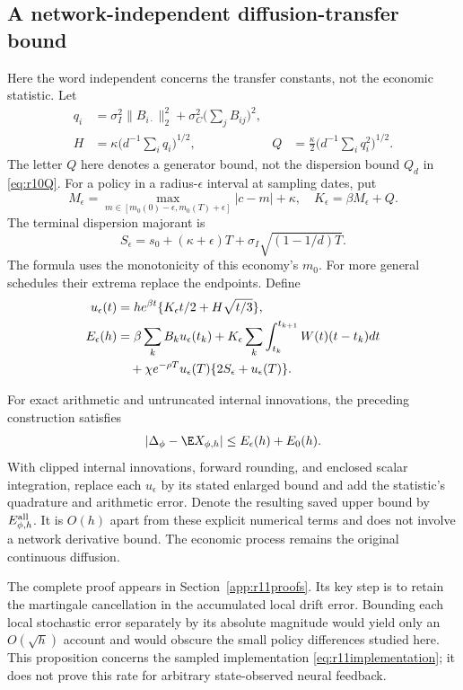 \subsection{A network-independent diffusion-transfer bound}
Here the word independent concerns the transfer constants, not the economic statistic. Let
\begin{align*}
 q_i&=\sigma_I^2\|B_{i\cdot}\|_2^2+
                  \sigma_C^2\Big(\sum_jB_{ij}\Big)^2,\\
 H&=\kappa\Big(d^{-1}\sum_i q_i\Big)^{1/2},&
 Q&=\frac\kappa2\Big(d^{-1}\sum_i q_i^2\Big)^{1/2}.
\end{align*}
The letter $Q$ here denotes a generator bound, not the dispersion bound $Q_d$ in \eqref{eq:r10Q}. For a policy in a radius-$\epsilon$ interval at sampling dates, put
\[
 M_\epsilon=\max_{m\in[m_0(0)-\epsilon,m_0(T)+\epsilon]}|c-m|+\kappa,
 \quad K_\epsilon=\beta M_\epsilon+Q.
\]
The terminal dispersion majorant is
\[
 S_\epsilon=s_0+(\kappa+\epsilon)T+
                         \sigma_I\sqrt{(1-1/d)T}.
\]
The formula uses the monotonicity of this economy's $m_0$. For more general schedules their extrema replace the endpoints. Define
\begin{align}
 u_\epsilon(t)&=h e^{\beta t}
       \{K_\epsilon t/2+H\sqrt{t/3}\},\label{eq:r11strong}\\
 E_\epsilon(h)&=\beta\sum_k B_k u_\epsilon(t_k)
       +K_\epsilon\sum_k\int_{t_k}^{t_{k+1}}W(t)(t-t_k)dt\notag\\
 &\quad+\chi e^{-\rho T}u_\epsilon(T)
                             \{2S_\epsilon+u_\epsilon(T)\}.
 \label{eq:r11bias}
\end{align}

\begin{proposition}\label{prop:r11transfer}
For exact arithmetic and untruncated internal innovations, the preceding construction satisfies
\[
 |\Delta_\phi-\E X_{\phi,h}|
       \leq E_\epsilon(h)+E_0(h).
\]
With clipped internal innovations, forward rounding, and enclosed scalar integration, replace each $u_\epsilon$ by its stated enlarged bound and add the statistic's quadrature and arithmetic error. Denote the resulting saved upper bound by $E_{\phi,h}^{\rm all}$. It is $O(h)$ apart from these explicit numerical terms and does not involve a network derivative bound. The economic process remains the original continuous diffusion.
\end{proposition}

The complete proof appears in Section~\ref{app:r11proofs}. Its key step is to retain the martingale cancellation in the accumulated local drift error. Bounding each local stochastic error separately by its absolute magnitude would yield only an $O(\sqrt h)$ account and would obscure the small policy differences studied here. This proposition concerns the sampled implementation \eqref{eq:r11implementation}; it does not prove this rate for arbitrary state-observed neural feedback.

